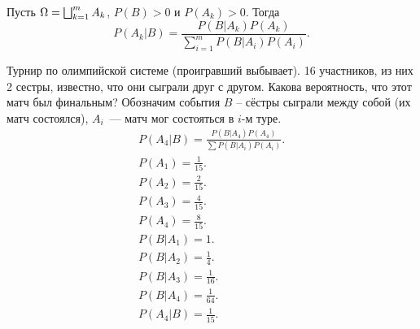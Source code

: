      \begin{theorem}[Байеса]
    Пусть $\Omega = \bigsqcup_{k=1}^m{A_k}$, $P(B) > 0$ и $P(A_k) > 0$. Тогда
         $$P(A_k|B) = \frac{P(B|A_k)P(A_k)}{\sum_{i=1}^m P(B|A_i)P(A_i)}.$$
     \end{theorem}
    
     \begin{example} Турнир по олимпийской системе (проигравший выбывает). 16 участников, из них 2 сестры, известно, что они сыграли друг с другом.
         Какова вероятность, что этот матч был финальным? Обозначим события $B$ -- сёстры сыграли между собой (их матч состоялся), $A_i$~--- матч мог состояться в $i$-м туре.
        \begin{gather*}
            P(A_4|B) = \frac{P(B|A_4)P(A_4)}{\sum P(B|A_i)P(A_i)}.\\
            P(A_1) = \frac{1}{15}.\\
            P(A_2) = \frac{2}{15}.\\
            P(A_3) = \frac{4}{15}.\\
            P(A_4) = \frac{8}{15}.\\
            P(B|A_1) = 1.\\
            P(B|A_2) = \frac{1}{4}.\\
            P(B|A_3) = \frac{1}{16}.\\
            P(B|A_4) = \frac{1}{64}.\\
            P(A_4|B)  = \frac{1}{15}.
        \end{gather*}
     \end{example}
    